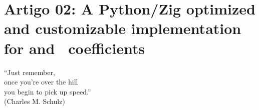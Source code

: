 \chapter{Artigo 02: A Python/Zig optimized and customizable
implementation for \pdcca and \dmc~coefficients}
\label{cap:paper_02}

\begin{flushright}
    ``Just remember, \\
    once you're over the hill\\
     you begin to pick up speed.''\\
    (Charles M. Schulz)
    \end{flushright}


    